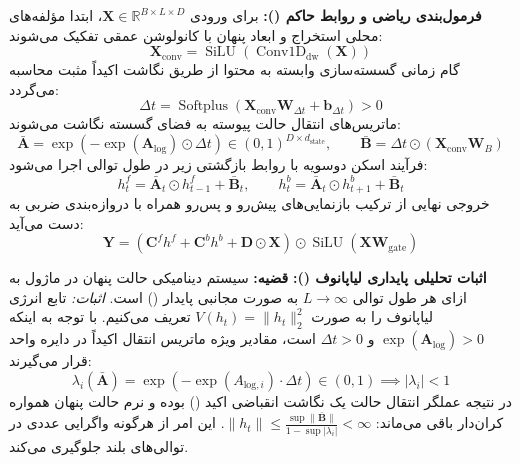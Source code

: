 \textbf{فرمول‌بندی ریاضی و روابط حاکم ():}
برای ورودی $\mathbf{X} \in \mathbb{R}^{B \times L \times D}$، ابتدا مؤلفه‌های محلی استخراج و ابعاد پنهان با کانولوشن عمقی تفکیک می‌شوند:
\begin{equation}
\mathbf{X}_{\text{conv}} = \operatorname{SiLU}(\operatorname{Conv1D}_{\text{dw}}(\mathbf{X}))
\end{equation}
گام زمانی گسسته‌سازی وابسته به محتوا از طریق نگاشت اکیداً مثبت محاسبه می‌گردد:
\begin{equation}
\Delta t = \operatorname{Softplus}(\mathbf{X}_{\text{conv}} \mathbf{W}_{\Delta t} + \mathbf{b}_{\Delta t}) > 0
\end{equation}
ماتریس‌های انتقال حالت پیوسته به فضای گسسته نگاشت می‌شوند:
\begin{equation}
\bar{\mathbf{A}} = \exp\left(-\exp(\mathbf{A}_{\text{log}}) \odot \Delta t\right) \in (0, 1)^{D \times d_{\text{state}}}, \qquad
\bar{\mathbf{B}} = \Delta t \odot (\mathbf{X}_{\text{conv}} \mathbf{W}_B)
\end{equation}
فرآیند اسکن دوسویه با روابط بازگشتی زیر در طول توالی اجرا می‌شود:
\begin{equation}
h_t^f = \bar{\mathbf{A}}_t \odot h_{t-1}^f + \bar{\mathbf{B}}_t, \qquad
h_t^b = \bar{\mathbf{A}}_t \odot h_{t+1}^b + \bar{\mathbf{B}}_t
\end{equation}
خروجی نهایی از ترکیب بازنمایی‌های پیش‌رو و پس‌رو همراه با دروازه‌بندی ضربی به دست می‌آید:
\begin{equation}
\mathbf{Y} = \left( \mathbf{C}^f h^f + \mathbf{C}^b h^b + \mathbf{D} \odot \mathbf{X} \right) \odot \operatorname{SiLU}(\mathbf{X} \mathbf{W}_{\text{gate}})
\end{equation}

\textbf{اثبات تحلیلی پایداری لیاپانوف ():}
\textbf{قضیه:} سیستم دینامیکی حالت پنهان در ماژول  به ازای هر طول توالی $L \to \infty$ به صورت مجانبی پایدار () است.
\textit{اثبات:} تابع انرژی لیاپانوف را به صورت $V(h_t) = \|h_t\|_2^2$ تعریف می‌کنیم. با توجه به اینکه $\exp(\mathbf{A}_{\text{log}}) > 0$ و $\Delta t > 0$ است، مقادیر ویژه ماتریس انتقال اکیداً در دایره واحد قرار می‌گیرند:
\begin{equation}
\lambda_i(\bar{\mathbf{A}}) = \exp(-\exp(A_{\text{log}, i}) \cdot \Delta t) \in (0, 1) \implies |\lambda_i| < 1
\end{equation}
در نتیجه عملگر انتقال حالت یک نگاشت انقباضی اکید () بوده و نرم حالت پنهان همواره کران‌دار باقی می‌ماند: $\|h_t\| \le \frac{\sup \|\bar{\mathbf{B}}\|}{1 - \sup |\lambda_i|} < \infty$. این امر از هرگونه واگرایی عددی در توالی‌های بلند جلوگیری می‌کند.



